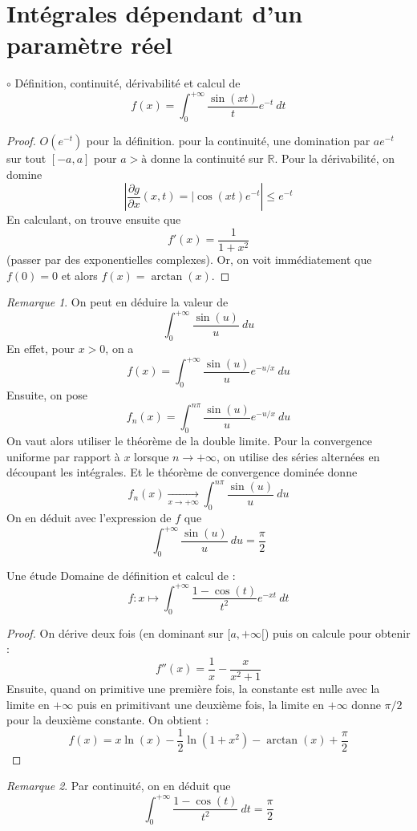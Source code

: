 \documentclass[french,a4paper]{article}
\newcommand{\R}{\mathbb{R}}
\theoremstyle{plain}
\theoremstyle{definition}
\theoremstyle{remark}
\newtheorem*{rmq}{Remarque}
\begin{document}
\section{Intégrales dépendant d'un paramètre réel}
\begin{ex}[Moulin.IP.18]{$\circ$}
	Définition, continuité, dérivabilité et calcul de $$f(x)=\int_{0}^{+\infty}\frac{\sin(xt)}{t}e^{-t}\ dt$$
\end{ex}
\begin{proof}
	$O(e^{-t})$ pour la définition. pour la continuité, une domination par $ae^{-t}$ sur tout $[-a,a]$ pour $a>à$ donne la continuité sur $\R$. Pour la dérivabilité, on domine $$\left\lvert\frac{\partial g}{\partial x}(x,t)=\lvert \cos(xt)e^{-t}\right\rvert\leqslant e^{-t}$$ En calculant, on trouve ensuite que $$f'(x)=\frac{1}{1+x^2}$$ (passer par des exponentielles complexes). Or, on voit immédiatement que $f(0)=0$ et alors $f(x)=\arctan(x)$.
\end{proof}
\begin{rmq}
	On peut en déduire la valeur de $$\int_{0}^{+\infty}\frac{\sin(u)}{u}\ du$$ En effet, pour $x>0$, on a $$f(x)=\int_{0}^{+\infty}\frac{\sin(u)}{u}e^{-u/x}\ du$$ Ensuite, on pose $$f_n(x)=\int_{0}^{n\pi}\frac{\sin(u)}{u}e^{-u/x}\ du$$ On vaut alors utiliser le théorème de la double limite. Pour la convergence uniforme par rapport à $x$ lorsque $n\to+\infty$, on utilise des séries alternées en découpant les intégrales. Et le théorème de convergence dominée donne $$f_n(x)\xrightarrow[x\to+\infty]{}\int_{0}^{n\pi}\frac{\sin(u)}{u}\ du$$ On en déduit avec l'expression de $f$ que $$\int_{0}^{+\infty}\frac{\sin(u)}{u}\ du=\frac{\pi}{2}$$
\end{rmq}
\begin{ex}[Moulin.IP.19]{Une étude}
	Domaine de définition et calcul de : $$f:x\mapsto\int_{0}^{+\infty}\frac{1-\cos(t)}{t^2}e^{-xt}\ dt$$
\end{ex}
\begin{proof}
	On dérive deux fois (en dominant sur $[a,+\infty[$) puis on calcule pour obtenir : $$f''(x)=\frac{1}{x}-\frac{x}{x^2+1}$$ Ensuite, quand on primitive une première fois, la constante est nulle avec la limite en $+\infty$ puis en primitivant une deuxième fois, la limite en $+\infty$ donne $\pi/2$ pour la deuxième constante. On obtient : $$f(x)=x\ln(x)-\frac{1}{2}\ln(1+x^2)-\arctan(x)+\frac{\pi}{2}$$
\end{proof}
\begin{rmq}
	Par continuité, on en déduit que $$\int_{0}^{+\infty}\frac{1-\cos(t)}{t^2}\ dt=\frac{\pi}{2}$$
\end{rmq}
\end{document}
